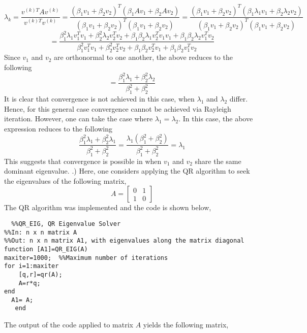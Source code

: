 \documentclass{article}
\begin{document}
$$\lambda_{k} = \frac{v^{(k)T}A v^{(k)}}{v^{(k)T} v^{(k)}} = \frac{(\beta_{1} v_{1} +   \beta_{2} v_{2})^{T} (\beta_{1}A v_{1} +   \beta_{2} Av_{2})}{(\beta_{1} v_{1} +   \beta_{2} v_{2})^{T} (\beta_{1} v_{1} +   \beta_{2} v_{2})} =  \frac{(\beta_{1} v_{1} +   \beta_{2} v_{2})^{T} (\beta_{1}\lambda_{1} v_{1} +   \beta_{2} \lambda_{2}v_{2})}{(\beta_{1} v_{1} +   \beta_{2} v_{2})^{T} (\beta_{1} v_{1} +   \beta_{2} v_{2})}
$$ 
 $$ = \frac{\beta_{1}^{2}\lambda_{1} v_{1}^{T}v_{1} + \beta_{2}^{2}\lambda_{2} v_{2}^{T}v_{2} + \beta_{1} \beta_{2}   \lambda_{1} v_{2}^{T} v_{1} v_{1}+ \beta_{1} \beta_{2}   \lambda_{2} v_{1}^{T} v_{2} }{ \beta_{1}^{2} v_{1}^{T}v_{1} + \beta_{2}^{2}v_{2}^{T}v_{2} + \beta_{1} \beta_{2}    v_{2}^{T} v_{1} + \beta_{1} \beta_{2}   v_{1}^{T} v_{2}}
$$ 
Since $v_{1}$ and $v_{2}$ are orthonormal to one another, the above reduces to the following 
$$ = \frac{\beta_{1}^{2}\lambda_{1} + \beta_{2}^{2}\lambda_{2}   }{ \beta_{1}^{2} + \beta_{2}^{2}}
$$ 
 It is clear that convergence is not achieved in this case, when $\lambda_{1}$ and $\lambda_{2}$ differ. Hence, for this general case convergence cannot be achieved via Rayleigh iteration. However, one can take the case where $\lambda_{1} = \lambda_{2}$. In this case, the above expression reduces to the following 
 $$  \frac{\beta_{1}^{2}\lambda_{1} + \beta_{2}^{2}\lambda_{1}   }{ \beta_{1}^{2} + \beta_{2}^{2}} =   \frac{\lambda_{1}(\beta_{1}^{2}+ \beta_{2}^{2} )  }{ \beta_{1}^{2} + \beta_{2}^{2}} = \lambda_{1} 
$$ 
 This suggests that convergence is possible in when $v_{1}$ and $v_{2}$ share the same dominant eigenvalue. 
 \newline   {}.) 
 \newline 
 \newline 
 Here, one considers applying the QR algorithm to seek the eigenvalues of the following matrix, 
 $$ A =
  \begin{bmatrix} 
  0& 1 \\ 
  1 &0 
  \end{bmatrix}$$ 
  The QR algorithm was implemented and the code is shown below, 
  \begin{lstlisting} 
  %%QR_EIG, QR Eigenvalue Solver 
%%In: n x n matrix A 
%%Out: n x n matrix A1, with eigenvalues along the matrix diagonal 
function [A1]=QR_EIG(A)  
maxiter=1000;  %%Maximum number of iterations 
for i=1:maxiter 
    [q,r]=qr(A); 
    A=r*q; 
end 
  A1= A; 
   end
 \end{lstlisting} 
  The output of the code applied to matrix $A$ yields the following matrix, 
\end{document}
